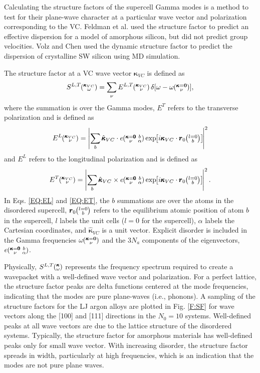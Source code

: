 \documentclass[12pt,twocolumn,iop]{/usr/share/texmf-texlive/tex/latex/iop/iopart}[/usr/share/texmf-texlive/tex/latex/iop/]
\newcommand{\EXP}[1]{\exp\mspace{-5.0mu}\left[#1\right]\mspace{-3.0mu}}
\newcommand{\ab}[2]{\mspace{-4.0mu}\left(\mspace{-8.0mu}
\begin{smallmatrix}&\ifthenelse{\equal{#1}{}}{a}{#1} \\&\ifthenelse
{\equal{#2}{}}{b}{#2}\end{smallmatrix}\mspace{-3.0mu}\right)}
\newcommand{\kgvba}{\mspace{-4.0mu}\left(\mspace{-8.0mu}
\begin{smallmatrix} &\pmb{\kappa}=\pmb{0} &b \\ &\nu 
&\alpha\end{smallmatrix}\mspace{-3.0mu}\right)}
\newcommand{\kvcv}{\mspace{-4.0mu}\left(\mspace{-8.0mu}
\begin{smallmatrix}&\pmb{\kappa}_{VC} \\&\nu\end{smallmatrix}
\mspace{-3.0mu}\right)}
\newcommand{\kgv}{\mspace{-4.0mu}\left(\mspace{-8.0mu}
\begin{smallmatrix}&\pmb{\kappa}=\mathbf{0} \\&\nu\end{smallmatrix}
\mspace{-3.0mu}\right)}
\newcommand{\kw}{\mspace{-4.0mu}\left(\mspace{-8.0mu}
\begin{smallmatrix}&\pmb{\kappa} \\&\omega\end{smallmatrix}
\mspace{-3.0mu}\right)}
\newcommand{\kvcw}{\mspace{-4.0mu}\left(\mspace{-8.0mu}
\begin{smallmatrix}&\pmb{\kappa}_{VC} \\&\omega\end{smallmatrix}
\mspace{-3.0mu}\right)}
\begin{document}
Calculating the structure factors of the supercell Gamma   
modes is a method to test for their plane-wave 
character at a particular wave vector and 
polarization corresponding to the VC. 
\cite{allen_diffusons_1999,feldman_numerical_1999} 
Feldman et al. used the structure factor to predict an effective 
dispersion for a model of amorphous silicon, but did not predict 
group velocities.\cite{feldman_numerical_1999} 
Volz and Chen used the dynamic structure factor to predict the
dispersion of crystalline SW silicon using MD simulation.
\cite{volz_molecular-dynamics_2000}

The structure factor at a VC wave vector 
$\pmb{\kappa}_{VC}$ is defined as\cite{allen_diffusons_1999} 
\begin{equation}\label{EQ:SLT}
S^{L,T}\kvcw = 
\sum_{\nu} E^{L,T}\kvcv
\delta [\omega-\omega\kgv],
\end{equation}
where the summation is over the Gamma modes, $E^{T}$ refers 
to the transverse polarization and is defined as
\begin{equation}\label{EQ:EL}
E^L\kvcv = 
\left|
\sum_{b} 
\hat{\pmb{\kappa}}_{VC} \cdot e\kgvba 
\EXP{i\pmb{\kappa}_{VC}\cdot\pmb{r}_0\ab{l=0}{b}} 
\right|^2
\end{equation}
and $E^{L}$ refers to the longitudinal polarization and is defined as
\begin{equation}\label{EQ:ET}
E^T\kvcv = 
\left|
\sum_{b} 
\hat{\pmb{\kappa}}_{VC} \times e\kgvba 
\EXP{i\pmb{\kappa}_{VC}\cdot\pmb{r}_0\ab{l=0}{b}} 
\right|^2.
\end{equation}
In Eqs. \eqref{EQ:EL} and \eqref{EQ:ET}, the $b$ summations are 
over the atoms in the disordered supercell, 
$\pmb{r}_0\ab{l=0}{b}$ refers to the equilibrium atomic position of 
atom $b$ in the supercell, $l$ labels the unit cells 
($l=0$ for the supercell), 
$\alpha$ labels the Cartesian coordinates, and 
$\hat{\pmb{\kappa}}_{VC}$ is a unit vector.  
Explicit disorder is included in the Gamma frequencies 
$\omega\kgv$ and the $3N_a$ components of the eigenvectors, $e\kgvba$.

Physically, $S^{L,T}\kw$ represents  
the frequency spectrum required to create a wavepacket with a 
well-defined wave vector and polarization.
\cite{allen_diffusons_1999,feldman_numerical_1999,green_density_2011} 
For a perfect lattice, the 
structure factor peaks are delta functions centered at the mode 
frequencies, indicating that the modes are pure plane-waves 
(i.e., phonons). 
A sampling of the structure factors for the LJ argon alloys 
are plotted in Fig. \ref{F:SF} for wave vectors along the [100] and [111] 
directions in the $N_0=10$ systems.\cite{vc_fn1}  
Well-defined peaks 
at all wave vectors are due to the 
lattice structure of the disordered systems. 
Typically, the structure factor for amorphous materials has well-defined 
peaks only for small wave vector.
\cite{allen_diffusons_1999,feldman_numerical_1999} 
With increasing disorder, the structure factor spreads in width,  
particularly at high frequencies, which is an indication that the 
modes are not pure plane waves. 
\end{document}
